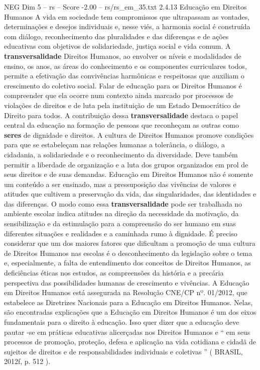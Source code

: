 \begin{textsample}{NEG Dim 5 – rs – Score -2.00 – rs/rs\_em\_35.txt}  \label{ex:f5_neg_024}
2.4.13 Educação em Direitos Humanos A vida em sociedade tem compromissos que ultrapassam as vontades, determinações e desejos individuais e, nesse viés, a harmonia social é construída com diálogo, reconhecimento das pluralidades e das diferenças e de ações educativas com objetivos de solidariedade, justiça social e vida comum.
A \textbf{transversalidade} Direitos Humanos, ao envolver os níveis e modalidades de ensino, os anos, as áreas do conhecimento e os componentes curriculares todos, permite a efetivação das convivências harmônicas e respeitosas que auxiliam o crescimento do coletivo social.
Falar de educação para os Direitos Humanos é compreender que ela ocorre num contexto ainda marcado por processos de violações de direitos e de luta pela instituição de um Estado Democrático de Direito para todos.
A contribuição dessa \textbf{transversalidade} destaca o papel central da educação na formação de pessoas que reconheçam as outras como \textbf{seres} de dignidade e direitos.
A cultura de Direitos Humanos promove condições para que se estabeleçam nas relações humanas a tolerância, o diálogo, a cidadania, a solidariedade e o reconhecimento da diversidade.
Deve também permitir a liberdade de organização e a luta dos grupos organizados em prol de seus direitos e de suas demandas.
Educação em Direitos Humanos não é somente um conteúdo a ser ensinado, mas a pressuposição das vivências de valores e atitudes que cultivem a preservação da vida, das singularidades, das identidades e das diferenças.
O modo como essa \textbf{transversalidade} pode ser trabalhada no ambiente escolar indica atitudes na direção da necessidade da motivação, da sensibilização e da estimulação para a compreensão do ser humano em suas diferentes situações e realidades e a caminhada rumo à dignidade.
É preciso considerar que um dos maiores fatores que dificultam a promoção de uma cultura de Direitos Humanos nas escolas é o desconhecimento da legislação sobre o tema e, especialmente, a falta de entendimento dos conceitos de Direitos Humanos, as deficiências éticas nos estudos, as compreensões da história e a precária perspectiva das possibilidades humanas de crescimento e vivências.
A Educação em Direitos Humanos está assegurada na Resolução CNE/CP nº. 01/2012, que estabelece as Diretrizes Nacionais para a Educação em Direitos Humanos.
Nelas, são encontradas explicações que a Educação em Direitos Humanos é um dos eixos fundamentais para o direito à educação.
Isso quer dizer que a educação deve pautar -se em práticas educativas alicerçadas nos Direitos Humanos e “ em seus processos de promoção, proteção, defesa e aplicação na vida cotidiana e cidadã de sujeitos de direitos e de responsabilidades individuais e coletivas ” ( BRASIL, 2012f, p. 512 ).

\end{textsample}
